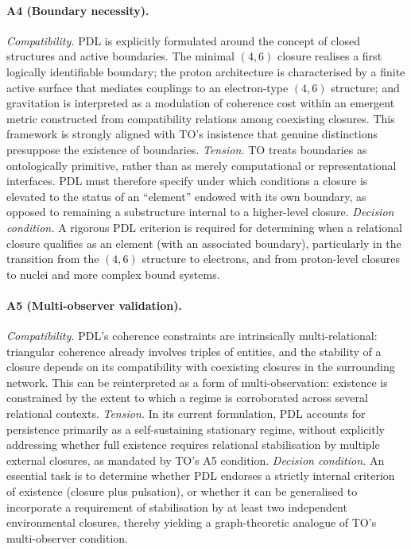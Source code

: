\documentclass[11pt,a4paper]{article}
\begin{document}
\paragraph{A4 (Boundary necessity).}
\emph{Compatibility.} PDL is explicitly formulated around the concept of closed structures and active boundaries. The minimal \((4,6)\) closure realises a first logically identifiable boundary; the proton architecture is characterised by a finite active surface that mediates couplings to an electron-type \((4,6)\) structure; and gravitation is interpreted as a modulation of coherence cost within an emergent metric constructed from compatibility relations among coexisting closures. This framework is strongly aligned with TO’s insistence that genuine distinctions presuppose the existence of boundaries.  
\emph{Tension.} TO treats boundaries as ontologically primitive, rather than as merely computational or representational interfaces. PDL must therefore specify under which conditions a closure is elevated to the status of an “element” endowed with its own boundary, as opposed to remaining a substructure internal to a higher-level closure.  
\emph{Decision condition.} A rigorous PDL criterion is required for determining when a relational closure qualifies as an element (with an associated boundary), particularly in the transition from the \((4,6)\) structure to electrons, and from proton-level closures to nuclei and more complex bound systems.

\paragraph{A5 (Multi-observer validation).}
\emph{Compatibility.} PDL’s coherence constraints are intrinsically multi-relational: triangular coherence already involves triples of entities, and the stability of a closure depends on its compatibility with coexisting closures in the surrounding network. This can be reinterpreted as a form of multi-observation: existence is constrained by the extent to which a regime is corroborated across several relational contexts.  
\emph{Tension.} In its current formulation, PDL accounts for persistence primarily as a self-sustaining stationary regime, without explicitly addressing whether full existence requires relational stabilisation by multiple external closures, as mandated by TO’s A5 condition.  
\emph{Decision condition.} An essential task is to determine whether PDL endorses a strictly internal criterion of existence (closure plus pulsation), or whether it can be generalised to incorporate a requirement of stabilisation by at least two independent environmental closures, thereby yielding a graph-theoretic analogue of TO’s multi-observer condition.
\end{document}
